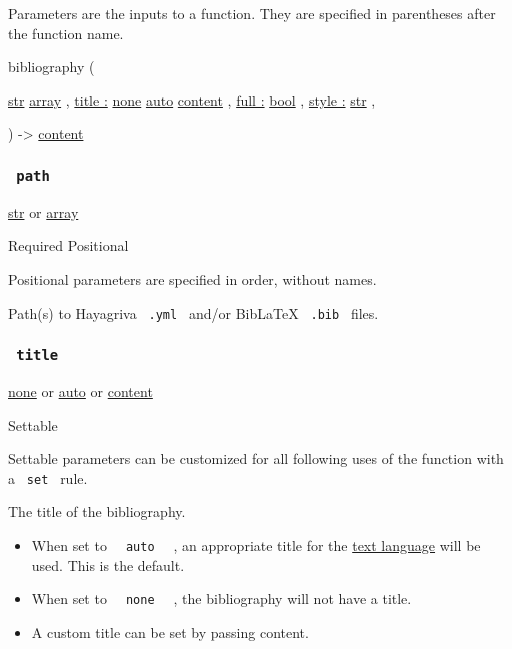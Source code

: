 \label{parameters-tooltip}
Parameters are the inputs to a function. They are specified in
parentheses after the function name.

{ bibliography } (

{ \href{/docs/reference/foundations/str/}{str}
\href{/docs/reference/foundations/array/}{array} , } {
\hyperref[parameters-title]{title :}
\href{/docs/reference/foundations/none/}{none}
\href{/docs/reference/foundations/auto/}{auto}
\href{/docs/reference/foundations/content/}{content} , } {
\hyperref[parameters-full]{full :}
\href{/docs/reference/foundations/bool/}{bool} , } {
\hyperref[parameters-style]{style :}
\href{/docs/reference/foundations/str/}{str} , }

) -\textgreater{} \href{/docs/reference/foundations/content/}{content}

\subsubsection{\texorpdfstring{\texttt{\ path\ }}{ path }}\label{parameters-path}

\href{/docs/reference/foundations/str/}{str} {or}
\href{/docs/reference/foundations/array/}{array}

{Required} {{ Positional }}

\label{parameters-path-positional-tooltip}
Positional parameters are specified in order, without names.

Path(s) to Hayagriva \texttt{\ .yml\ } and/or BibLaTeX \texttt{\ .bib\ }
files.

\subsubsection{\texorpdfstring{\texttt{\ title\ }}{ title }}\label{parameters-title}

\href{/docs/reference/foundations/none/}{none} {or}
\href{/docs/reference/foundations/auto/}{auto} {or}
\href{/docs/reference/foundations/content/}{content}

{{ Settable }}

\label{parameters-title-settable-tooltip}
Settable parameters can be customized for all following uses of the
function with a \texttt{\ set\ } rule.

The title of the bibliography.

\begin{itemize}
\tightlist
\item
  When set to \texttt{\ }{\texttt{\ auto\ }}\texttt{\ } , an appropriate
  title for the \href{/docs/reference/text/text/\#parameters-lang}{text
  language} will be used. This is the default.
\item
  When set to \texttt{\ }{\texttt{\ none\ }}\texttt{\ } , the
  bibliography will not have a title.
\item
  A custom title can be set by passing content.
\end{itemize}


